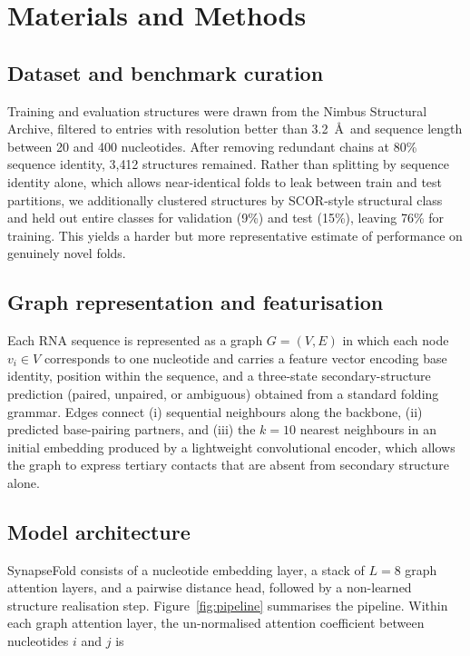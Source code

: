 \section{Materials and Methods}
\label{sec:methods}

\subsection{Dataset and benchmark curation}
\label{sec:dataset}

Training and evaluation structures were drawn from the Nimbus Structural Archive, filtered to entries with resolution better than 3.2~\AA\ and sequence length between 20 and 400 nucleotides. After removing redundant chains at 80\% sequence identity, 3{,}412 structures remained. Rather than splitting by sequence identity alone, which allows near-identical folds to leak between train and test partitions, we additionally clustered structures by SCOR-style structural class and held out entire classes for validation (9\%) and test (15\%), leaving 76\% for training. This yields a harder but more representative estimate of performance on genuinely novel folds.

\subsection{Graph representation and featurisation}
\label{sec:graph}

Each RNA sequence is represented as a graph $G = (V, E)$ in which each node $v_i \in V$ corresponds to one nucleotide and carries a feature vector encoding base identity, position within the sequence, and a three-state secondary-structure prediction (paired, unpaired, or ambiguous) obtained from a standard folding grammar. Edges connect (i) sequential neighbours along the backbone, (ii) predicted base-pairing partners, and (iii) the $k=10$ nearest neighbours in an initial embedding produced by a lightweight convolutional encoder, which allows the graph to express tertiary contacts that are absent from secondary structure alone.

\subsection{Model architecture}
\label{sec:architecture}

SynapseFold consists of a nucleotide embedding layer, a stack of $L=8$ graph attention layers, and a pairwise distance head, followed by a non-learned structure realisation step. Figure~\ref{fig:pipeline} summarises the pipeline. Within each graph attention layer, the un-normalised attention coefficient between nucleotides $i$ and $j$ is

